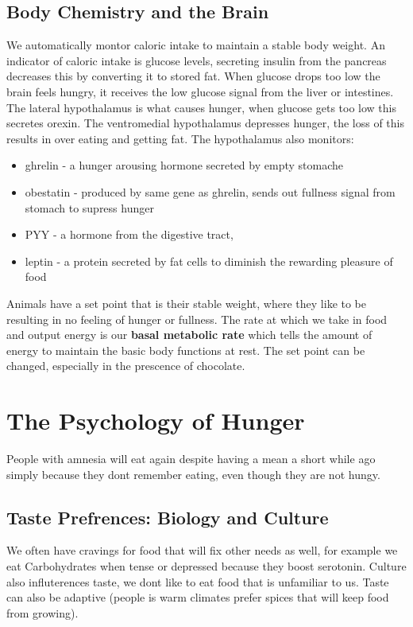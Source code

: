\documentclass[12pt]{article}
\begin{document}
\subsection*{Body Chemistry and the Brain}
We automatically montor caloric intake to maintain a stable body weight. An indicator of caloric intake is glucose levels, secreting insulin from the pancreas decreases this by converting it to stored fat. When glucose drops too low the brain feels hungry, it receives the low glucose signal from the liver or intestines. The lateral hypothalamus is what causes hunger, when glucose gets too low this secretes orexin. The ventromedial hypothalamus depresses hunger, the loss of this results in over eating and getting fat. The hypothalamus also monitors:
\begin{itemize}
\item ghrelin - a hunger arousing hormone secreted by empty stomache
\item obestatin - produced by same gene as ghrelin, sends out fullness signal from stomach to supress hunger
\item PYY - a hormone from the digestive tract, 
\item leptin - a protein secreted by fat cells to diminish the rewarding pleasure of food
\end{itemize}
Animals have a set point that is their stable weight, where they like to be resulting in no feeling of hunger or fullness. The rate at which we take in food and output energy is our \textbf{basal metabolic rate} which tells the amount of energy to maintain the basic body functions at rest. The set point can be changed, especially in the prescence of chocolate.
\section*{The Psychology of Hunger}
People with amnesia will eat again despite having a mean a short while ago simply because they dont remember eating, even though they are not hungy.
\subsection*{Taste Prefrences: Biology and Culture}
We often have cravings for food that will fix other needs as well, for example we eat Carbohydrates when tense or depressed because they boost serotonin. Culture also influterences taste, we dont like to eat food that is unfamiliar to us. Taste can also be adaptive (people is warm climates prefer spices that will keep food from growing).
\end{document}
